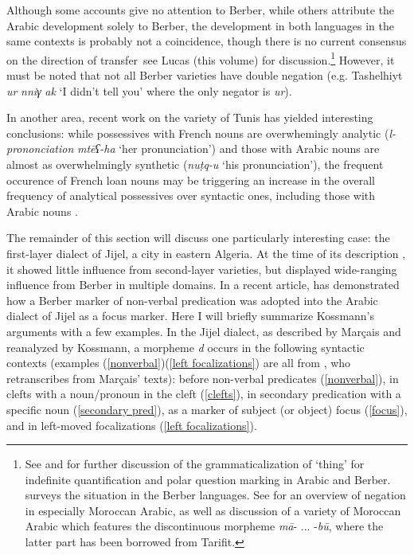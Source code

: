 \documentclass[output=paper]{langsci/langscibook}
\begin{document}
Although some accounts give no attention to Berber, while others attribute the Arabic development solely to Berber, the development in both languages in the same contexts is probably not a coincidence, though there is no current consensus on the direction of transfer \textendash \,see Lucas (this volume) for discussion.\footnote{See \citet{Lucas2007,Lucas2010,Lucas2018} and \citet{Souag2018thing} for further discussion of the grammaticalization of `thing’ for indefinite quantification and polar question marking in Arabic and Berber. \citet[324–334]{Kossmann2013book} surveys the situation in the Berber languages. See \citet{Lafkioui2013reinventing} for an overview of negation in especially Moroccan Arabic, as well as discussion of a variety of Moroccan Arabic which features the discontinuous morpheme \textit{mā}{}- ... -\textit{bū}, where the latter part has been borrowed from Tarifit.} However, it must be noted that not all Berber varieties have double negation (e.g. Tashelhiyt \textit{ur} \textit{nniγ} \textit{ak} ‘I didn’t tell you’ where the only negator is \textit{ur}).

  In another area, recent work on the variety of Tunis has yielded interesting conclusions: while possessives with French nouns are overwhemingly analytic (\textit{l-prononciation} \textit{mtēʕ-ha} ‘her pronunciation’) and those with Arabic nouns are almost as overwhelmingly synthetic (\textit{nuṭq-u} ‘his pronunciation’), the frequent occurence of French loan nouns may be triggering an increase in the overall frequency of analytical possessives over syntactic ones, including those with Arabic nouns \citep{Sayahi2015}.

  The remainder of this section will discuss one particularly interesting case: the first-layer dialect of Jijel, a city in eastern Algeria. At the time of its description \citep{Marçais1956}, it showed little influence from second-layer varieties, but displayed wide-ranging influence from Berber in multiple domains. In a recent article, \citet{Kossmann2014} has demonstrated how a Berber marker of non-verbal predication was adopted into the Arabic dialect of Jijel as a focus marker. Here I will briefly summarize Kossmann’s arguments with a few examples. In the Jijel dialect, as described by Marçais and reanalyzed by Kossmann, a morpheme \textit{d} occurs in the following syntactic contexts (examples (\ref{nonverbal})\textendash(\ref{left focalizations}) are all from \citealt[129]{Kossmann2014}, who retranscribes from Marçais’ texts): before non-verbal predicates (\ref{nonverbal}), in clefts with a noun/pronoun in the cleft (\ref{clefts}), in secondary predication with a specific noun (\ref{secondary pred}), as a marker of subject (or object) focus (\ref{focus}), and in left-moved focalizations (\ref{left focalizations}).
\end{document}
